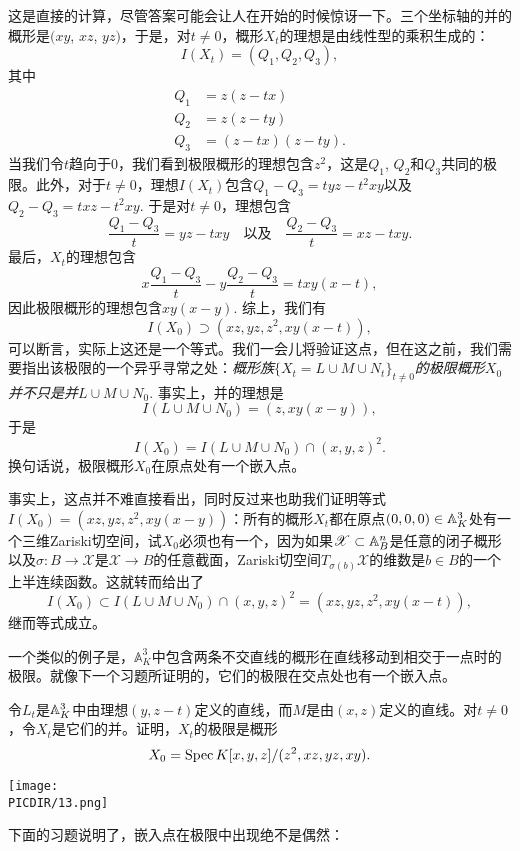 这是直接的计算，尽管答案可能会让人在开始的时候惊讶一下。三个坐标轴的并的概形是$(xy$, $xz$, $yz)$，于是，对$t\neq 0$，概形$X_t$的理想是由线性型的乘积生成的：
\[
	I(X_t)=(Q_1,Q_2,Q_3),
\]
其中
\[
	\begin{aligned}
		Q_1&=z(z-tx)\\
		Q_2&=z(z-ty)\\
		Q_3&=(z-tx)(z-ty).
	\end{aligned}
\]
当我们令$t$趋向于$0$，我们看到极限概形的理想包含$z^2$，这是$Q_1$, $Q_2$和$Q_3$共同的极限。此外，对于$t\neq 0$，理想$I(X_t)$包含$Q_1-Q_3=tyz-t^2xy$以及$Q_2-Q_3=txz-t^2xy$. 于是对$t\neq 0$，理想包含
\[
	\frac{Q_1-Q_3}{t}=yz-txy\quad\text{以及}\quad \frac{Q_2-Q_3}{t}=xz-txy.
\]
最后，$X_t$的理想包含
\[
	x\frac{Q_1-Q_3}{t}-y\frac{Q_2-Q_3}{t}=txy(x-t),
\]
因此极限概形的理想包含$xy(x-y)$. 综上，我们有
\[
	I(X_0)\supset (xz,yz,z^2,xy(x-t)),
\]
可以断言，实际上这还是一个等式。我们一会儿将验证这点，但在这之前，我们需要指出该极限的一个异乎寻常之处：\textit{概形族}$\{X_t=L\cup M\cup N_t\}_{t\neq 0}$\textit{的极限概形}$X_0$\textit{并不只是并}$L\cup M\cup N_0$. 事实上，并的理想是
\[
	I(L\cup M\cup N_0)=(z,xy(x-y)),
\]
于是
\[
	I(X_0)=I(L\cup M\cup N_0)\cap (x,y,z)^2.
\]
换句话说，极限概形$X_0$在原点处有一个嵌入点。

事实上，这点并不难直接看出，同时反过来也助我们证明等式$I(X_0)=(xz,yz,z^2,xy(x-y))$：所有的概形$X_t$都在原点$(0,0,0)\in\mathbb{A}_K^3$处有一个三维Zariski切空间，试$X_0$必须也有一个，因为如果$\mathscr{X}\subset \mathbb{A}_B^n$是任意的闭子概形以及$\sigma:B\to\mathscr{X}$是$\mathscr{X}\to B$的任意截面，Zariski切空间$T_{\sigma(b)}\mathscr{X}$的维数是$b\in B$的一个上半连续函数。这就转而给出了
\[
	I(X_0)\subset I(L\cup M\cup N_0)\cap (x,y,z)^2=(xz,yz,z^2,xy(x-t)),
\]
继而等式成立。

一个类似的例子是，$\mathbb{A}_K^3$中包含两条不交直线的概形在直线移动到相交于一点时的极限。就像下一个习题所证明的，它们的极限在交点处也有一个嵌入点。

\begin{exe}
令$L_t$是$\mathbb{A}_K^3$中由理想$(y,z-t)$定义的直线，而$M$是由$(x,z)$定义的直线。对$t\neq 0$，令$X_t$是它们的并。证明，$X_t$的极限是概形
\[
	X_0=\operatorname{Spec} K[x,y,z]/(z^2,xz,yz,xy).
\]

\begin{center}\texttt{[image: \\PICDIR/13.png]}\end{center}
\end{exe}

下面的习题说明了，嵌入点在极限中出现绝不是偶然：

